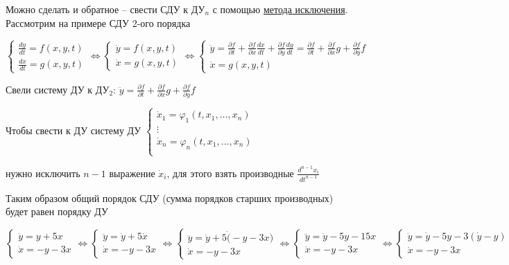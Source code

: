 \documentclass[12pt]{article}
\begin{document}
    \hypertarget{exceptionmethod}{}

    Можно сделать и обратное -- свести СДУ к ДУ$_n$ с помощью 
    \underline{метода исключения}. Рассмотрим на примере СДУ 2-ого порядка

    $\begin{cases}
         \frac{dy}{dt} = f(x, y, t) \\
         \frac{dx}{dt} = g(x, y, t)
    \end{cases} \Longleftrightarrow \begin{cases}
         \dot{y} = f(x, y, t) \\
         \dot{x} = g(x, y, t)
    \end{cases} \Longleftrightarrow \begin{cases}
         \ddot y = \frac{\partial f}{\partial t} + \frac{\partial f}{\partial x}\frac{dx}{dt} + \frac{\partial f}{\partial y}\frac{dy}{dt} = \frac{\partial f}{\partial t} + \frac{\partial f}{\partial x}g + \frac{\partial f}{\partial y}f \\
         \dot{x} = g(x, y, t)
    \end{cases}$

    Свели систему ДУ к ДУ$_2$: $\ddot y = \frac{\partial f}{\partial t} + \frac{\partial f}{\partial x}g + \frac{\partial f}{\partial y}f$

    \Nota Чтобы свести к ДУ систему ДУ $\begin{cases}
         \dot x_1 = \varphi_1(t, x_1, \dots, x_n) \\
         \vdots \\
         \dot x_n = \varphi_n(t, x_1, \dots, x_n) \\
    \end{cases}$ 
    
    нужно исключить $n - 1$ выражение $\dot x_i$, для этого взять производные $\frac{d^{n - 1} x_i}{dt^{n - 1}}$

    Таким образом общий порядок СДУ (сумма порядков старших производных) будет равен порядку ДУ

    \Ex
    $\begin{cases}
        \dot y = y + 5x \\
        \dot x = -y - 3x
    \end{cases} \Longleftrightarrow
    \begin{cases}
        \ddot y = \dot y + 5\dot x \\
        \dot x = -y - 3x
    \end{cases} \Longleftrightarrow
    \begin{cases}
        \ddot y = \dot y + 5\dot (-y - 3x) \\
        \dot x = -y - 3x
    \end{cases} \Longleftrightarrow
    \begin{cases}
        \ddot y = \dot y - 5y - 15x \\
        \dot x = -y - 3x
    \end{cases} \Longleftrightarrow
    \begin{cases}
        \ddot y = \dot y - 5y - 3(\dot y - y) \\
        \dot x = -y - 3x
    \end{cases} \Longleftrightarrow \ddot y + 2\dot y + 2y = 0$
\end{document}
